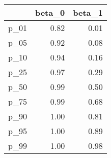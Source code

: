 \begin{table}[ht]
\centering
\begin{tabular}{rrr}
  \hline
 & beta\_0 & beta\_1 \\ 
  \hline
p\_01 & 0.82 & 0.01 \\ 
  p\_05 & 0.92 & 0.08 \\ 
  p\_10 & 0.94 & 0.16 \\ 
  p\_25 & 0.97 & 0.29 \\ 
  p\_50 & 0.99 & 0.50 \\ 
  p\_75 & 0.99 & 0.68 \\ 
  p\_90 & 1.00 & 0.81 \\ 
  p\_95 & 1.00 & 0.89 \\ 
  p\_99 & 1.00 & 0.98 \\ 
   \hline
\end{tabular}
\end{table}
